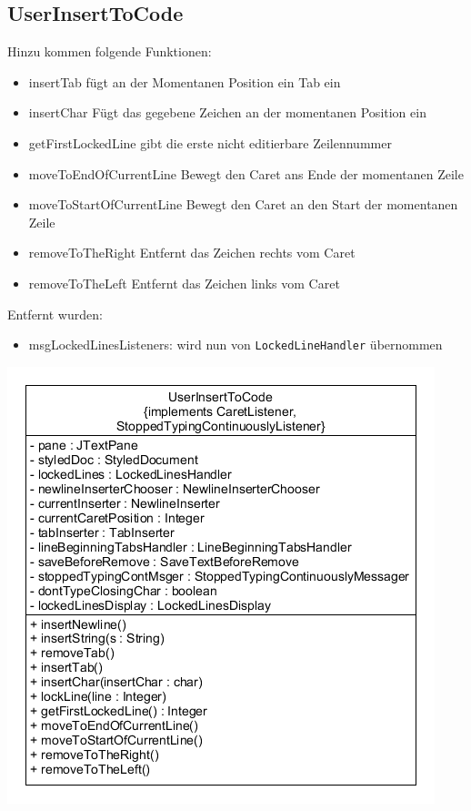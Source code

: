 \documentclass[a4paper]{scrreprt}
\begin{document}
\subsection{UserInsertToCode}
Hinzu kommen folgende Funktionen:
\begin{itemize}
\item insertTab fügt an der Momentanen Position ein Tab ein
\item insertChar Fügt das gegebene Zeichen an der momentanen Position ein
\item getFirstLockedLine gibt die erste nicht editierbare Zeilennummer
\item moveToEndOfCurrentLine Bewegt den Caret ans Ende der momentanen Zeile
\item moveToStartOfCurrentLine Bewegt den Caret an den Start der momentanen Zeile
\item removeToTheRight Entfernt das Zeichen rechts vom Caret
\item removeToTheLeft Entfernt das Zeichen links vom Caret
\end{itemize}

Entfernt wurden:
\begin{itemize}
\item msgLockedLinesListeners: wird nun von \verb!LockedLineHandler! übernommen
\end{itemize}

\includegraphics[scale=0.5]{inputtocode_update.png}
\end{document}
